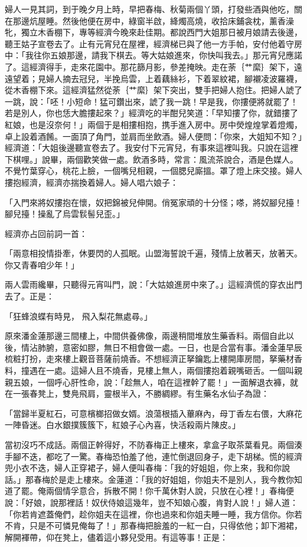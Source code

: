 \begin{showcontents}{}
婦人一見其詞，到于晚夕月上時，早把春梅、秋菊兩個丫頭，打發些酒與他吃，關在那邊炕屋睡。然後他便在房中，綠窗半啟，絳燭高燒，收拾床鋪衾枕，薰香澡牝，獨立木香棚下，專等經濟今晚來赴佳期。都說西門大姐那日被月娘請去後邊，聽王姑子宣卷去了。止有元宵兒在屋裡，經濟梯已與了他一方手帕，安付他着守房中：「我往你五娘那邊，請我下棋去。等大姑娘進來，你快叫我去。」那元宵兒應諾了。這經濟得手，走來花園中。那花篩月影，參差掩映。走在荼｛艹縻｝架下，遠遠望着；見婦人摘去冠兒，半挽烏雲，上着藕絲衫，下着翠紋裙，腳襯凌波羅襪，從木香棚下來。這經濟猛然從荼｛艹縻｝架下突出，雙手把婦人抱住。把婦人諕了一跳，說：「呸！小短命！猛可鑽出來，諕了我一跳！早是我，你摟便將就罷了！若是別人，你也恁大膽摟起來？」經濟吃的半酣兒笑道：「早知摟了你，就錯摟了紅娘，也是沒奈何！」兩個于是相摟相抱，携手進入房中。房中熒煌煌掌着燈燭，卓上設着酒餚。一面頂了角門，並肩而坐飲酒。婦人便問：「你來，大姐知不知？」經濟道：「大姐後邊聽宣卷去了。我安付下元宵兒，有事來這裡叫我。只說在這裡下棋哩。」說畢，兩個歡笑做一處。飲酒多時，常言：風流茶說合，酒是色媒人。不覺竹葉穿心，桃花上臉，一個嘴兒相親，一個腮兒廝搵。罩了燈上床交接。婦人摟抱經濟，經濟亦揣換着婦人。婦人唱六娘子：

「入門來將奴摟抱在懷，奴把錦被兒伸開。俏冤家頑的十分怪；嗏，將奴腳兒擡！腳兒擡！操亂了烏雲䯼髻兒歪。」

經濟亦占回前詞一首：

「兩意相投情掛牽，休要閃的人孤眠。山盟海誓說千遍，殘情上放著天，放著天。你又青春咱少年！」

兩人雲雨纔畢，只聽得元宵叫門，說：「大姑娘進房中來了。」這經濟慌的穿衣出門去了。正是：

「狂蜂浪蝶有時見，  飛入梨花無處尋。」

原來潘金蓮那邊三間樓上，中間供養佛像，兩邊稍間堆放生藥香料。兩個自此以後，情沾肺腑，意密如膠，無日不相會做一處。一日，也是合當有事。潘金蓮早辰梳粧打扮，走來樓上觀音菩薩前燒香。不想經濟正拏鑰匙上樓開庫房間，拏藥材香料，撞遇在一處。這婦人且不燒香，見樓上無人，兩個摟抱着親嘴砸舌。一個叫親親五娘，一個呼心肝性命，說：「趁無人，咱在這裡幹了罷！」一面解退衣褲，就在一張春凳上，雙鳧飛肩，靈根半入，不勝綢繆。有生藥名水仙子為證：

「當歸半夏紅石，可意檳榔招做女婿。浪蕩根插入蓽麻內，母丁香左右偎，大麻花一陣昏迷。白水銀撲簇簇下，紅娘子心內喜，快活殺兩片陳皮。」

當初沒巧不成話。兩個正幹得好，不防春梅正上樓來，拿盒子取茶葉看見。兩個湊手腳不迭，都吃了一驚。春梅恐怕羞了他，連忙倒退回身子，走下胡梯。慌的經濟兜小衣不迭，婦人正穿裙子，婦人便叫春梅：「我的好姐姐，你上來，我和你說話。」那春梅於是走上樓來。金蓮道：「我的好姐姐，你姐夫不是別人，我今教你知道了罷。俺兩個情孚意合，拆散不開！你千萬休對人說，只放在心裡！」春梅便說：「好娘，說那裡話！奴伏侍娘這幾年，豈不知娘心腹，肯對人說！」婦人道：「你若肯遮蓋俺們，趁你姐夫在這裡，你也過來和你姐夫睡一睡，我方信你。你若不肯，只是不可憐見俺每了！」那春梅把臉羞的一紅一白，只得依他；卸下湘裙，解開褌帶，仰在凳上，儘着這小夥兒受用。有這等事！正是：


\end{showcontents}
